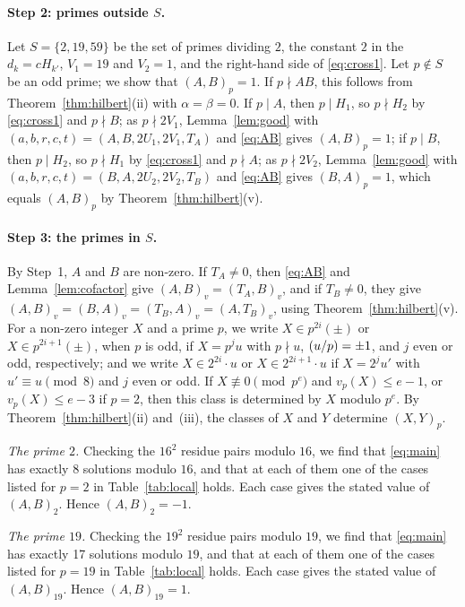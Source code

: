 \documentclass[11pt]{article}
\newcommand{\leg}[2]{\mathchoice{\biggl(\dfrac{#1}{#2}\biggr)}{(#1/#2)}{(#1/#2)}{(#1/#2)}}
\begin{document}
\paragraph{Step 2: primes outside $S$.} Let $S=\{2,19,59\}$ be the set of primes dividing $2$, the constant $2$ in the $d_k=cH_{k'}$, $V_{1}=19$ and $V_{2}=1$, and the right-hand side of \eqref{eq:cross1}. Let $p\notin S$ be an odd prime; we show that $(A,B)_p=1$. If $p\nmid AB$, this follows from Theorem~\ref{thm:hilbert}(ii) with $\alpha=\beta=0$. If $p\mid A$, then $p\mid H_{1}$, so $p\nmid H_{2}$ by \eqref{eq:cross1} and $p\nmid B$; as $p\nmid 2V_{1}$, Lemma~\ref{lem:good} with $(a,b,r,c,t)=(A,B,2U_{1},2V_{1},T_A)$ and \eqref{eq:AB} gives $(A,B)_p=1$; if $p\mid B$, then $p\mid H_{2}$, so $p\nmid H_{1}$ by \eqref{eq:cross1} and $p\nmid A$; as $p\nmid 2V_{2}$, Lemma~\ref{lem:good} with $(a,b,r,c,t)=(B,A,2U_{2},2V_{2},T_B)$ and \eqref{eq:AB} gives $(B,A)_p=1$, which equals $(A,B)_p$ by Theorem~\ref{thm:hilbert}(v).

\paragraph{Step 3: the primes in $S$.} By Step~1, $A$ and $B$ are non-zero. If $T_A\neq0$, then \eqref{eq:AB} and Lemma~\ref{lem:cofactor} give $(A,B)_v=(T_A,B)_v$, and if $T_B\neq0$, they give $(A,B)_v=(B,A)_v=(T_B,A)_v=(A,T_B)_v$, using Theorem~\ref{thm:hilbert}(v). For a non-zero integer $X$ and a prime $p$, we write $X\in p^{2i}(\pm)$ or $X\in p^{2i+1}(\pm)$, when $p$ is odd, if $X=p^ju$ with $p\nmid u$, $\leg{u}{p}=\pm1$, and $j$ even or odd, respectively; and we write $X\in2^{2i}\cdot u$ or $X\in2^{2i+1}\cdot u$ if $X=2^ju'$ with $u'\equiv u\pmod 8$ and $j$ even or odd. If $X\not\equiv0\pmod{p^e}$ and $v_p(X)\leq e-1$, or $v_p(X)\leq e-3$ if $p=2$, then this class is determined by $X$ modulo $p^e$. By Theorem~\ref{thm:hilbert}(ii) and~(iii), the classes of $X$ and $Y$ determine $(X,Y)_p$.

\emph{The prime $2$.} Checking the $16^2$ residue pairs modulo $16$, we find that \eqref{eq:main} has exactly 8 solutions modulo $16$, and that at each of them one of the cases listed for $p=2$ in Table~\ref{tab:local} holds. Each case gives the stated value of $(A,B)_{2}$. Hence $(A,B)_{2}=-1$.

\emph{The prime $19$.} Checking the $19^2$ residue pairs modulo $19$, we find that \eqref{eq:main} has exactly 17 solutions modulo $19$, and that at each of them one of the cases listed for $p=19$ in Table~\ref{tab:local} holds. Each case gives the stated value of $(A,B)_{19}$. Hence $(A,B)_{19}=1$.
\end{document}
